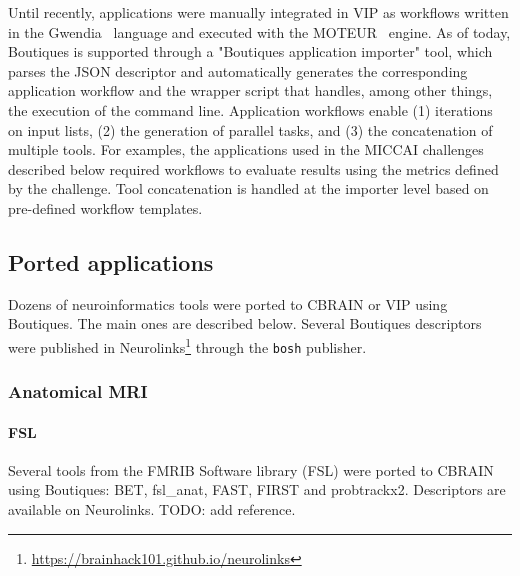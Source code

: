 \documentclass[a4paper,num-refs]{oup-contemporary}
\newcommand{\todo}[1]{\color{red}TODO: #1\color{black}}
\newcommand{\boutiques}{Boutiques\xspace}
\begin{document}
Until recently, applications were manually integrated in VIP as
workflows written in the Gwendia~\cite{MONT-09} language and executed
with the MOTEUR~\cite{GLAT-08} engine.  As of today, Boutiques is
supported through a "Boutiques application importer" tool, which
parses the JSON descriptor and automatically generates the
corresponding application workflow and the wrapper script that
handles, among other things, the execution of the command line.
Application workflows enable (1) iterations on input lists, (2) the
generation of parallel tasks, and (3) the concatenation of multiple
tools. For examples, the applications used in the MICCAI challenges
described below required workflows to evaluate results using the
metrics defined by the challenge. Tool concatenation is 
handled at the importer level based on pre-defined workflow
templates.

\subsection{Ported applications}



Dozens of neuroinformatics tools were ported to CBRAIN or VIP using
\boutiques. The main ones are described below. Several \boutiques
descriptors were published in
Neurolinks\footnote{\url{https://brainhack101.github.io/neurolinks}}
through the \texttt{bosh} publisher.




\subsubsection{Anatomical MRI}

\paragraph{FSL} Several tools from the FMRIB Software
library (FSL) were ported to CBRAIN using \boutiques: BET, fsl\_anat, FAST,
FIRST and probtrackx2. Descriptors are available on Neurolinks. \todo{add reference.}
\end{document}

